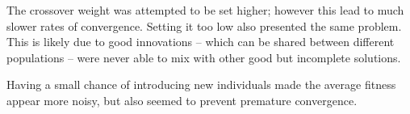 \begin{description}
The crossover weight was attempted to be set higher; however this lead to much slower rates of convergence. Setting it too low also presented the same problem. This is likely due to good innovations -- which can be shared between different populations -- were never able to mix with other good but incomplete solutions.

Having a small chance of introducing new individuals made the average fitness appear more noisy, but also seemed to prevent premature convergence.



\end{description}
